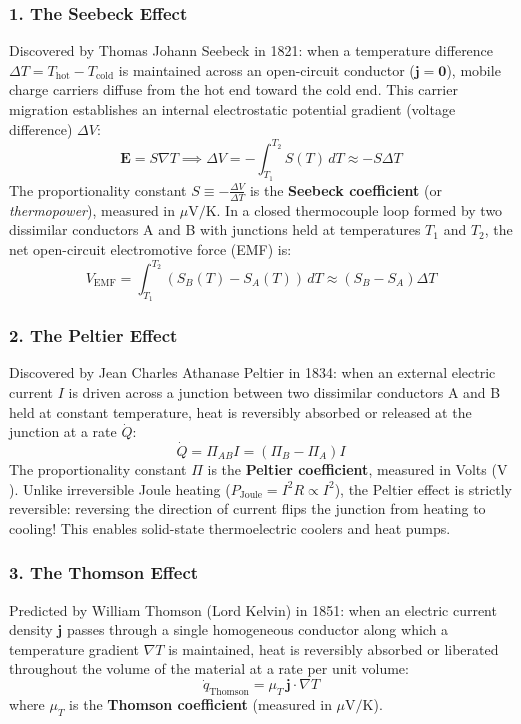 \documentclass[11pt,a4paper]{article}
\newcommand{\vb}[1]{\mathbf{#1}}
\begin{document}
\subsubsection{1. The Seebeck Effect}
Discovered by Thomas Johann Seebeck in 1821: when a temperature difference $\Delta T = T_{\mathrm{hot}} - T_{\mathrm{cold}}$ is maintained across an open-circuit conductor ($\vb{j} = \vb{0}$), mobile charge carriers diffuse from the hot end toward the cold end. This carrier migration establishes an internal electrostatic potential gradient (voltage difference) $\Delta V$:
\begin{equation}
\vb{E} = S\nabla T \implies \Delta V = -\int_{T_1}^{T_2} S(T)\,dT \approx -S \Delta T
\label{eq:seebeck_effect}
\end{equation}
The proportionality constant $S \equiv -\frac{\Delta V}{\Delta T}$ is the \textbf{Seebeck coefficient} (or \emph{thermopower}), measured in $\mu\mathrm{V/K}$. In a closed thermocouple loop formed by two dissimilar conductors A and B with junctions held at temperatures $T_1$ and $T_2$, the net open-circuit electromotive force (EMF) is:
\begin{equation}
V_{\mathrm{EMF}} = \int_{T_1}^{T_2} (S_B(T) - S_A(T))\,dT \approx (S_B - S_A)\Delta T
\end{equation}

\subsubsection{2. The Peltier Effect}
Discovered by Jean Charles Athanase Peltier in 1834: when an external electric current $I$ is driven across a junction between two dissimilar conductors A and B held at constant temperature, heat is reversibly absorbed or released at the junction at a rate $\dot{Q}$:
\begin{equation}
\dot{Q} = \Pi_{AB} I = (\Pi_B - \Pi_A) I
\label{eq:peltier_effect}
\end{equation}
The proportionality constant $\Pi$ is the \textbf{Peltier coefficient}, measured in Volts ($\mathrm{V}$). Unlike irreversible Joule heating ($P_{\mathrm{Joule}} = I^2 R \propto I^2$), the Peltier effect is strictly reversible: reversing the direction of current flips the junction from heating to cooling! This enables solid-state thermoelectric coolers and heat pumps.

\subsubsection{3. The Thomson Effect}
Predicted by William Thomson (Lord Kelvin) in 1851: when an electric current density $\vb{j}$ passes through a single homogeneous conductor along which a temperature gradient $\nabla T$ is maintained, heat is reversibly absorbed or liberated throughout the volume of the material at a rate per unit volume:
\begin{equation}
\dot{q}_{\mathrm{Thomson}} = \mu_T\, \vb{j}\cdot\nabla T
\label{eq:thomson_effect}
\end{equation}
where $\mu_T$ is the \textbf{Thomson coefficient} (measured in $\mu\mathrm{V/K}$).
\end{document}
